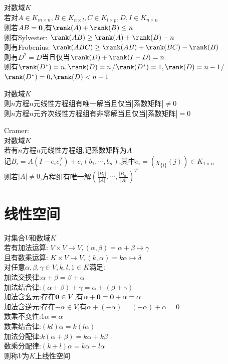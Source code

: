 \begin{dingli}
对数域$K$\\
若对$A\in K_{m\times n},B\in K_{n\times l},C\in K_{l\times p},D,I\in K_{n\times n}$\\
则若$AB={\bf0}$,有$\rank(A)+\rank(B)\leq n$\\
则有Sylvester: $\rank(AB)\geq \rank(A)+\rank(B)-n$\\
则有Frobenius: $\rank(ABC)\geq \rank(AB)+\rank(BC)-\rank(B)$\\
则有$D^2=D$当且仅当$\rank(D)+\rank(I-D)=n$\\
则有\mbox{$\rank(D^*)=n,\rank(D)=n$/$\rank(D^*)=1,\rank(D)=n-1$/$\rank(D^*)=0,\rank(D)<n-1$}
\end{dingli}

\begin{dingli}
对数域$K$\\
则$n$方程$n$元线性方程组有唯一解当且仅当$|\text{系数矩阵}|\neq0$\\
则$n$方程$n$元齐次线性方程组有非零解当且仅当$|\text{系数矩阵}|=0$
\end{dingli}

\begin{dingli}
Cramer:\\
对数域$K$\\
若有$n$方程$n$元线性方程组,记系数矩阵为$A$\\
记$B_{i}=A(I-e_ie_i^{T})+e_i(b_1,\cdots,b_n)$,其中$e_i=(\chi_{\{i\}}(j))\in K_{1\times n}$\\
则若$|A|\neq 0$,方程组有唯一解$(\frac{|B_1|}{|A|},\cdots,\frac{|B_n|}{|A|})^{T}$
\end{dingli}

\chapter{线性空间}

\begin{dingyi}
对集合$V$和数域$K$\\
若有加法运算: $V\times V\to V,(\alpha,\beta)=\alpha+\beta\mapsto\gamma$\\
且有数乘运算: $K\times V\to V,(k,\alpha)=k\alpha\mapsto \delta$\\
对任意$\alpha,\beta,\gamma\in V,k,l,1\in K$满足:\\
加法交换律:$\alpha+\beta=\beta+\alpha$\\
加法结合律:$(\alpha+\beta)+\gamma=\alpha+(\beta+\gamma)$\\
加法含幺元:存在${\bf0}\in V$,有$\alpha+{\bf0}={\bf0}+\alpha=\alpha$\\
加法含逆元:存在$-\alpha\in V$,有$\alpha+(-\alpha)=(-\alpha)+\alpha=0$\\
数乘不变性:$1\alpha=\alpha$\\
数乘结合律:$(kl)\alpha=k(l\alpha)$\\
加法分配律:$k(\alpha+\beta)=k\alpha+k\beta$\\
数乘分配律:$(k+l)\alpha=k\alpha+l\alpha$\\
则称$V$为$K$上线性空间
\end{dingyi}


